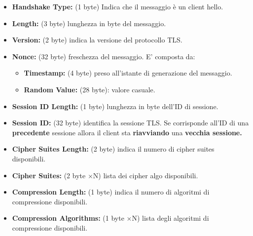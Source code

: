 \begin{definition}\label{def:clienthello}
\begin{itemize}
    \item \textbf{Handshake Type:} (1 byte) Indica che il messaggio è un client hello.
    \item \textbf{Length:} (3 byte) lunghezza in byte del messaggio.
    \item \textbf{Version:} (2 byte) indica la versione del protocollo TLS.
    \item \textbf{Nonce:} (32 byte) freschezza del messaggio. E' composta da:
    \begin{itemize}
        \item \textbf{Timestamp:} (4 byte) preso all'istante di generazione del messaggio.
        \item \textbf{Random Value:} (28 byte): valore casuale.
    \end{itemize}
    \item \textbf{Session ID Length:} (1 byte) lunghezza in byte dell'ID di sessione.
    \item \textbf{Session ID:} (32 byte) identifica la sessione TLS. Se corrisponde all'ID di una \textbf{precedente} sessione allora il client sta \textbf{riavviando} una \textbf{vecchia sessione.}
    \item \textbf{Cipher Suites Length:} (2 byte) indica il numero di cipher suites disponibili.
    \item \textbf{Cipher Suites:} (2 byte $\times$N) lista dei cipher algo disponibili.
    \item \textbf{Compression Length:} (1 byte) indica il numero di algoritmi di compressione disponibili.
    \item \textbf{Compression Algorithms:} (1 byte $\times$N) lista degli algoritmi di compressione disponibili.
\end{itemize}
\end{definition}
